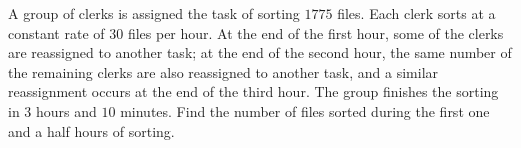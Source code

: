A group of clerks is assigned the task of sorting $1775$ files.  Each clerk sorts at a constant rate of $30$ files per hour.  At the end of the first hour, some of the clerks are reassigned to another task; at the end of the second hour, the same number of the remaining clerks are also reassigned to another task, and a similar reassignment occurs at the end of the third hour.  The group finishes the sorting in $3$ hours and $10$ minutes.  Find the number of files sorted during the first one and a half hours of sorting.
